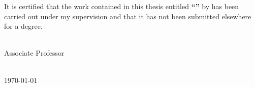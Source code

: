 \begin{minipage}{\textwidth}
    
    It is certified that the work contained in this thesis entitled \textbf{\enquote{\ttitle}} by \textbf{\authornames} has been carried out under my supervision and that it has not been submitted elsewhere for a degree.
        
\end{minipage}

\vspace{20.00mm}

\begin{minipage}{0.49\textwidth}
		\begin{flushleft}
			{\supnameA\\ 
			Associate Professor\\
			\deptname\\
			\univname}
		\end{flushleft}
\end{minipage}

\vspace{2cm}

\begin{center} 
    \today\\[2cm]
\end{center}

\vfill
\clearpage %
